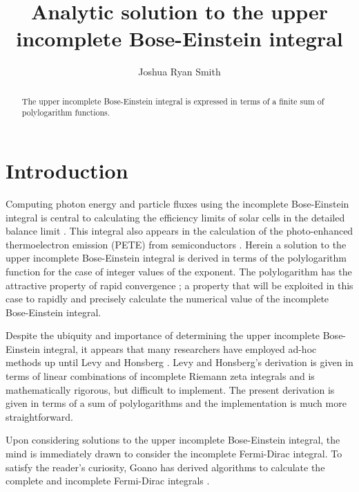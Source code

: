 \documentclass[aip,jap,reprint]{revtex4-1}
\makeatletter
\newcommand{\Title}{Analytic solution to the upper incomplete Bose-Einstein integral}
\newcommand{\AuthorName}{Joshua Ryan Smith}
\newcommand{\AuthorEmail}{joshua.smith133.ctr@mail.mil}
\makeatother
\begin{document}
\title{\Title}
\author{\AuthorName}
\email{\AuthorEmail}


\begin{abstract}
The upper incomplete Bose-Einstein integral is expressed in terms of a finite sum of polylogarithm functions.
\end{abstract}



\maketitle


\section{Introduction}
Computing photon energy and particle fluxes using the incomplete Bose-Einstein integral is central to calculating the efficiency limits of solar cells in the detailed balance limit \cite{10.1063/1.1736034}. This integral also appears in the calculation of the photo-enhanced thermoelectron emission (PETE) from semiconductors \cite{10.1038/nmat2814}. Herein a solution to the upper incomplete Bose-Einstein integral is derived in terms of the polylogarithm function for the case of integer values of the exponent. The polylogarithm has the attractive property of rapid convergence \cite{http://academic.reed.edu/physics/faculty/crandall/papers/Polylog}; a property that will be exploited in this case to rapidly and precisely calculate the numerical value of the incomplete Bose-Einstein integral.

Despite the ubiquity and importance of determining the upper incomplete Bose-Einstein integral, it appears that many researchers have employed ad-hoc methods up until Levy and Honsberg \cite{10.1016/j.sse.2006.06.017}. Levy and Honsberg's derivation is given in terms of linear combinations of incomplete Riemann zeta integrals and is mathematically rigorous, but difficult to implement. The present derivation is given in terms of a sum of polylogarithms and the implementation is much more straightforward.

Upon considering solutions to the upper incomplete Bose-Einstein integral, the mind is immediately drawn to consider the incomplete Fermi-Dirac integral. To satisfy the reader's curiosity, Goano has derived algorithms to calculate the complete and incomplete Fermi-Dirac integrals \cite{10.1145/210089.210090}.
\end{document}
